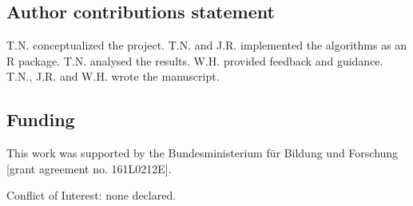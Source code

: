 \documentclass[unnumsec,webpdf,contemporary,large]{oup-authoring-template}%
\theoremstyle{thmstyleone}%
\theoremstyle{thmstyletwo}%
\theoremstyle{thmstylethree}%
\begin{document}
\subsection{Author contributions statement}

T.N. conceptualized the project. T.N. and J.R. implemented the algorithms as 
an R package. T.N. analysed the results. W.H. provided feedback and guidance. 
T.N., J.R. and W.H. wrote the manuscript.



\subsection{Funding}

This work was supported by the Bundesministerium für Bildung und Forschung 
[grant agreement no. 161L0212E].

Conflict of Interest: none declared.


%
%
\end{document}

